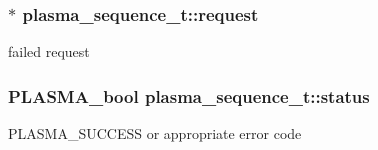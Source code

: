 \subsubsection[{request}]{$\ast$ plasma\+\_\+sequence\+\_\+t\+::request}\label{structplasma__sequence__t_a63c74296604414466c13fc935d9db565_a63c74296604414466c13fc935d9db565}
failed request \hypertarget{structplasma__sequence__t_adf37ddea62dfaaa498c0defe68be01a4_adf37ddea62dfaaa498c0defe68be01a4}{}
\subsubsection[{status}]{\setlength{\rightskip}{0pt plus 5cm}P\+L\+A\+S\+M\+A\+\_\+bool plasma\+\_\+sequence\+\_\+t\+::status}\label{structplasma__sequence__t_adf37ddea62dfaaa498c0defe68be01a4_adf37ddea62dfaaa498c0defe68be01a4}
P\+L\+A\+S\+M\+A\+\_\+\+S\+U\+C\+C\+E\+S\+S or appropriate error code 
